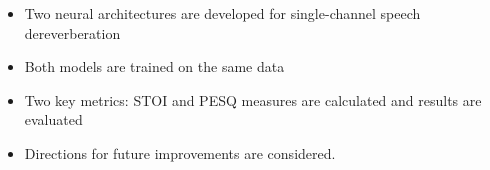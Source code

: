 \begin{itemize}
	\item Two neural architectures are developed for single-channel speech dereverberation
	\item Both models are trained on the same data
	\item Two key metrics: STOI and PESQ measures are calculated and results are evaluated
	\item Directions for future improvements are considered.
\end{itemize}
